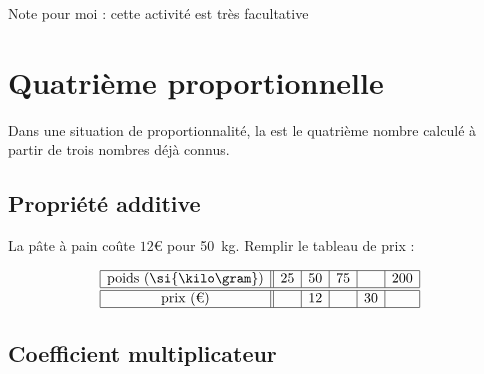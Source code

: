 Note pour moi : cette activité est très facultative 

 

\section{Quatrième proportionnelle}

\begin{definition}
    Dans une situation de proportionnalité, la  est le quatrième nombre calculé à partir de trois nombres déjà connus.
\end{definition}

\subsection{Propriété additive}

La pâte à pain coûte \( 12\)€ pour \SI{50}{\kilo\gram}. Remplir le tableau de prix :

\begin{equation*}
    \begin{array}[]{|c||c|c|c|c|c|}
        \hline
        \text{poids (\si{\kilo\gram})}&25&50&75&&200\\
        \hline\hline
        \text{prix (€)}&&12&&30&\\
        \hline
    \end{array}
\end{equation*}

\subsection{Coefficient multiplicateur}

